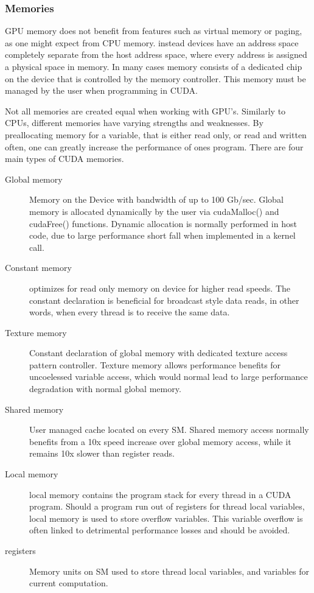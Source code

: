 \subsubsection{Memories}\label{sssec:memories}
GPU memory does not benefit from features such as virtual
memory or paging, as one might expect from CPU memory. instead devices have an
address space completely separate from the host address space, where every address is assigned a physical space in memory.
In many cases memory consists of a dedicated chip on the device that is controlled
by the memory controller.  This memory must be managed by the user when programming in CUDA.
\par
Not all memories are created equal when working with GPU's.  Similarly to \Glspl{CPU},
different memories have varying strengths and weaknesses.  By preallocating memory for a variable,
that is either read only, or read and written often, one can greatly increase the
performance of ones program.   %
There are four main types of CUDA memories.
\begin{description}
  \item [Global memory] Memory on the Device with bandwidth of up to 100 Gb/sec.
  Global memory is allocated dynamically by the user via cudaMalloc() and cudaFree() functions.
  Dynamic allocation is normally performed in host code, due to large performance short fall
  when implemented in a kernel call.
  \item [Constant memory] optimizes for read only memory on device for higher
  read speeds.  The constant declaration is beneficial for broadcast style data
  reads, in other words, when every thread is to receive the same data.
  \item [Texture memory] Constant declaration of global memory with dedicated
   texture access pattern controller.  Texture memory allows performance benefits
   for uncoelessed variable access, which would normal lead to large performance
   degradation with normal global memory.
  \item [Shared memory] User managed cache located on every \Gls{SM}.  Shared memory access
  normally benefits from a 10x speed increase over global memory access, while it remains
  10x slower than register reads.\cite{Wilt} %
  \item [Local memory] local memory contains the program stack for every thread
  in a CUDA program. Should a program run out of registers for thread local variables,
  local memory is  used to store overflow variables. This variable overflow is often
  linked to detrimental performance losses and should be avoided.\cite{Wilt}
  \item [registers] Memory units on \Gls{SM} used to store thread local variables,
                    and variables for current computation.
\end{description}


